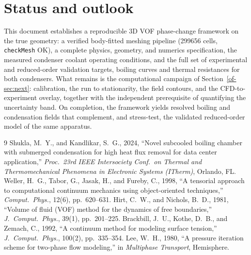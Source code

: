 \documentclass[11pt]{article}
\begin{document}
\section{Status and outlook}
\label{of-sec:status}
This document establishes a reproducible 3D VOF phase-change framework on the true
geometry: a verified body-fitted meshing pipeline (\num{299656} cells, \texttt{checkMesh}
OK), a complete physics, geometry, and numerics specification, the measured condenser
coolant operating conditions, and the full set of experimental and reduced-order
validation targets, boiling curves and thermal resistances for both condensers. What
remains is the computational campaign of Section~\ref{of-sec:next}: calibration, the run to stationarity,
the field contours, and the CFD-to-experiment overlay, together with the independent
prerequisite of quantifying the uncertainty band. On completion, the framework yields
resolved boiling and condensation fields that complement, and stress-test, the validated
reduced-order model of the same apparatus.

\clearpage
\begin{thebibliography}{9}
\small
{} Shukla, M.~Y., and Kandlikar, S.~G., 2024, ``Novel subcooled boiling chamber with submerged condensation for high heat flux removal for data center application,'' \textit{Proc.\ 23rd IEEE Intersociety Conf.\ on Thermal and Thermomechanical Phenomena in Electronic Systems (ITherm)}, Orlando, FL.
 Weller, H.~G., Tabor, G., Jasak, H., and Fureby, C., 1998, ``A
tensorial approach to computational continuum mechanics using object-oriented
techniques,'' \textit{Comput.\ Phys.}, 12(6), pp.~620--631.
 Hirt, C.~W., and Nichols, B.~D., 1981, ``Volume of fluid (VOF) method
for the dynamics of free boundaries,'' \textit{J.\ Comput.\ Phys.}, 39(1), pp.~201--225.
 Brackbill, J.~U., Kothe, D.~B., and Zemach, C., 1992, ``A continuum
method for modeling surface tension,'' \textit{J.\ Comput.\ Phys.}, 100(2), pp.~335--354.
 Lee, W.~H., 1980, ``A pressure iteration scheme for two-phase flow
modeling,'' in \textit{Multiphase Transport}, Hemisphere.
\end{thebibliography}
\end{document}
